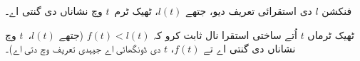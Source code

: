 \documentclass[../../../include/open-logic-section]{subfiles}
\begin{document}
\begin{prob}
  فنکشن $l$ دی استقرائی تعریف دیو، جتھے $l(t)$، ٹھیک ٹرم~$t$ وچ نشاناں دی گنتی اے۔
\end{prob}

\begin{prob}
  ٹھیک ٹرماں $t$ اُتے ساختی استقرا نال ثابت کرو کہ $f(t) < l(t)$ (جتھے $l(t)$،~$t$ وچ نشاناں دی گنتی اے تے $f(t)$، $t$ دی ڈونگھائی اے جیہدی تعریف  وچ دتی اے)۔
\end{prob}
\end{document}
